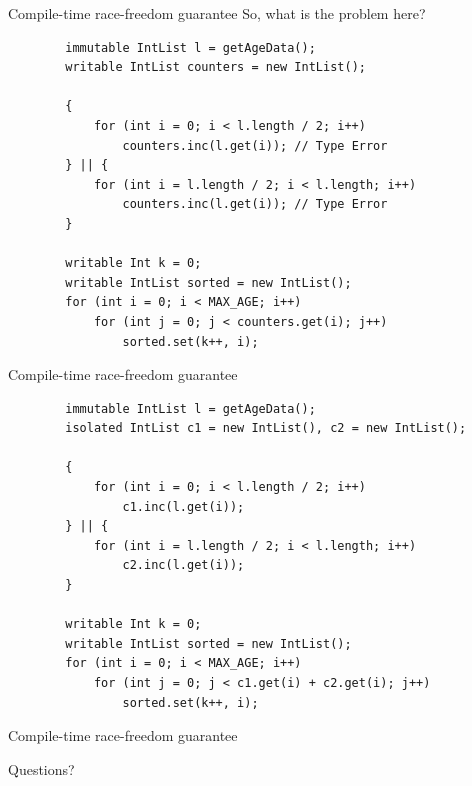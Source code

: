 \documentclass{beamer}
\begin{document}
\begin{frame}[fragile]{Compile-time race-freedom guarantee}
	So, what is the problem here?
	\begin{lstlisting}
        immutable IntList l = getAgeData();
        writable IntList counters = new IntList();
        
        {
            for (int i = 0; i < l.length / 2; i++)
                counters.inc(l.get(i)); // Type Error
        } || {
            for (int i = l.length / 2; i < l.length; i++)
                counters.inc(l.get(i)); // Type Error
        }
        
        writable Int k = 0;
        writable IntList sorted = new IntList();
        for (int i = 0; i < MAX_AGE; i++)
            for (int j = 0; j < counters.get(i); j++)
                sorted.set(k++, i);
	\end{lstlisting}
\end{frame}

\begin{frame}[fragile]{Compile-time race-freedom guarantee}
	\begin{lstlisting}
        immutable IntList l = getAgeData();
        isolated IntList c1 = new IntList(), c2 = new IntList();
        
        {
            for (int i = 0; i < l.length / 2; i++)
                c1.inc(l.get(i));
        } || {
            for (int i = l.length / 2; i < l.length; i++)
                c2.inc(l.get(i));
        }
        
        writable Int k = 0;
        writable IntList sorted = new IntList();
        for (int i = 0; i < MAX_AGE; i++)
            for (int j = 0; j < c1.get(i) + c2.get(i); j++)
                sorted.set(k++, i);
	\end{lstlisting}
\end{frame}


\begin{frame}{Compile-time race-freedom guarantee}
	\begin{center}
	\end{center}
\end{frame}


\begin{frame}[focus]
	Questions?
\end{frame}

\end{document}
